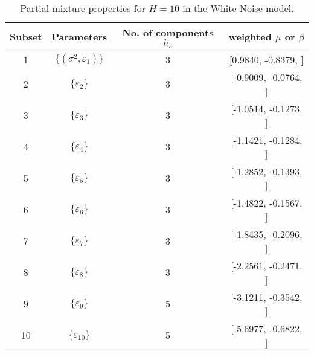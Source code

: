\begin{table}[h] 
\centering 
\caption{Partial mixture properties for $H=10$ in the White Noise model.} 
\label{tab:pmits_WN} 
\begin{tabular}{cccc}  
 Subset & Parameters& No. of components $h_{s}$ & weighted $\mu$ or $\beta$  \\ \hline 
1 & $\{(\sigma^{2},\varepsilon_{1})\}$ & 3 & [0.9840, -0.8379, ]   \\ [1ex] 
2 & $\{\varepsilon_{2}\}$ & 3 & [-0.9009, -0.0764, ]   \\ [1ex] 
3 & $\{\varepsilon_{3}\}$ & 3 & [-1.0514, -0.1273, ]   \\ [1ex] 
4 & $\{\varepsilon_{4}\}$ & 3 & [-1.1421, -0.1284, ]   \\ [1ex] 
5 & $\{\varepsilon_{5}\}$ & 3 & [-1.2852, -0.1393, ]   \\ [1ex] 
6 & $\{\varepsilon_{6}\}$ & 3 & [-1.4822, -0.1567, ]   \\ [1ex] 
7 & $\{\varepsilon_{7}\}$ & 3 & [-1.8435, -0.2096, ]   \\ [1ex] 
8 & $\{\varepsilon_{8}\}$ & 3 & [-2.2561, -0.2471, ]   \\ [1ex] 
9 & $\{\varepsilon_{9}\}$ & 5 & [-3.1211, -0.3542, ]   \\ [1ex] 
10 & $\{\varepsilon_{10}\}$ & 5 & [-5.6977, -0.6822, ]   \\ [1ex] 
\hline 
\end{tabular} 
\end{table} 
